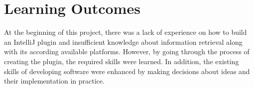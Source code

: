 \documentclass{l4proj}
\begin{document}
\section{Learning Outcomes}

At the beginning of this project, there was a lack of experience on how to build an IntelliJ plugin and insufficient knowledge about information retrieval along with its according available platforms. However, by going through the process of creating the plugin, the required skills were learned. In addition, the existing skills of developing software were enhanced by making decisions about ideas and their implementation in practice.




\end{document}
